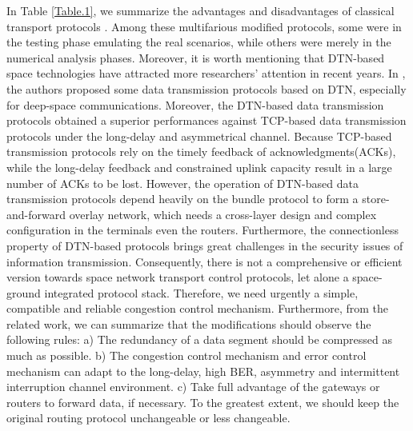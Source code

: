 \documentclass[draftclsnofoot,onecolumn,11pt]{IEEEtran}
\begin{document}
In Table \ref{Table.1}, we summarize the advantages and disadvantages of classical transport protocols \cite{taleb2006refwa} \cite{marchese2004petra} \cite{luglio2004board}. Among these multifarious modified protocols, some were in the testing phase emulating the real scenarios, while others were merely in the numerical analysis phases. Moreover, it is worth mentioning that DTN-based space technologies have attracted more researchers' attention in recent years. In \cite{yu2013dtn}\cite{hu2014memory}\cite{yu2015performance}, the authors proposed some data transmission protocols based on DTN, especially for deep-space communications. Moreover, the DTN-based data transmission protocols obtained a superior performances against TCP-based data transmission protocols under the long-delay and asymmetrical channel. Because TCP-based transmission protocols rely on the timely feedback of acknowledgments(ACKs), while the long-delay feedback and constrained uplink capacity result in a large number of ACKs to be lost. However, the operation of DTN-based data transmission protocols depend heavily on the bundle protocol to form a store-and-forward overlay network, which needs a cross-layer design and complex configuration in the terminals even the routers. Furthermore, the connectionless property of DTN-based protocols brings great challenges in the security issues of information transmission.
Consequently, there is not a comprehensive or efficient version towards space network transport control protocols, let alone a space-ground integrated protocol stack.
Therefore, we need urgently a simple, compatible and reliable congestion control mechanism. Furthermore, from the related work, we can summarize that the modifications should observe the following rules:
a) The redundancy of a data segment should be compressed as much as possible.
b) The congestion control mechanism and error control mechanism can adapt to the long-delay, high BER, asymmetry and intermittent interruption channel environment.
c) Take full advantage of the gateways or routers to forward data, if necessary. To the greatest extent, we should keep the original routing protocol unchangeable or less changeable.
\end{document}
